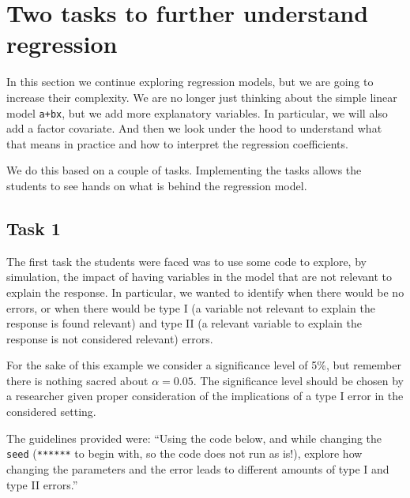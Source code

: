 \documentclass[
]{book}
\begin{document}
\hypertarget{two-tasks-to-further-understand-regression}{%
\section{Two tasks to further understand regression}\label{two-tasks-to-further-understand-regression}}

In this section we continue exploring regression models, but we are going to increase their complexity. We are no longer just thinking about the simple linear model \texttt{a+bx}, but we add more explanatory variables. In particular, we will also add a factor covariate. And then we look under the hood to understand what that means in practice and how to interpret the regression coefficients.

We do this based on a couple of tasks. Implementing the tasks allows the students to see hands on what is behind the regression model.

\hypertarget{task-1}{%
\subsection{Task 1}\label{task-1}}

The first task the students were faced was to use some code to explore, by simulation, the impact of having variables in the model that are not relevant to explain the response. In particular, we wanted to identify when there would be no errors, or when there would be type I (a variable not relevant to explain the response is found relevant) and type II (a relevant variable to explain the response is not considered relevant) errors.

For the sake of this example we consider a significance level of 5\%, but remember there is nothing sacred about \(\alpha=0.05\). The significance level should be chosen by a researcher given proper consideration of the implications of a type I error in the considered setting.

The guidelines provided were: ``Using the code below, and while changing the \texttt{seed} (\texttt{******} to begin with, so the code does not run as is!), explore how changing the parameters and the error leads to different amounts of type I and type II errors.''
\end{document}

